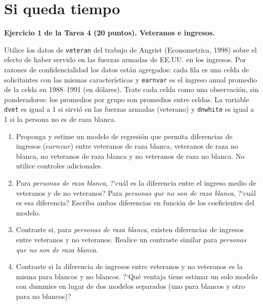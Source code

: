 \documentclass[letterpaper,11pt]{article}
\begin{document}
\vspace{1em}

\section*{Si queda tiempo}

\noindent\textbf{Ejercicio 1 de la Tarea 4 (20 puntos). Veteranos e ingresos.}

Utilice los datos de \texttt{veteran} del trabajo de Angrist (Econometrica,
1998) sobre el efecto de haber servido en las fuerzas armadas de EE.UU. en los ingresos.
Por razones de confidencialidad los datos est\'an agregados: cada fila es una celda de
solicitantes con las mismas caracter\'isticas y \texttt{earnvar} es el ingreso anual promedio
de la celda en 1988--1991 (en d\'olares). Trate cada celda como una observaci\'on, sin
ponderadores: los promedios por grupo son promedios entre celdas. La
variable \texttt{dvet} es igual a 1 si sirvi\'o en las fuerzas armadas (veterano) y
\texttt{dnwhite} es igual a 1 si la persona no es de raza blanca.
\begin{enumerate}
    \item Proponga y estime un modelo de regresi\'on que permita diferencias de
        ingresos ($earnvar$) entre veteranos de raza blanca, veteranos de raza no blanca, no
        veteranos de raza blanca y no veteranos de raza no blanca. No utilice controles
        adicionales.
    \item Para \emph{personas de raza blanca}, ?`cu\'al es la diferencia entre
        el ingreso medio de veteranos y de no veteranos? Para \emph{personas que no son de
        raza blanca}, ?`cu\'al es esa diferencia? Escriba ambas diferencias en funci\'on de
        los coeficientes del modelo.
    \item Contraste si, para \emph{personas de raza blanca}, existen diferencias
        de ingresos entre veteranos y no veteranos. Realice un contraste similar para
        \emph{personas que no son de raza blanca}.
    \item Contraste si la diferencia de ingresos entre veteranos y no veteranos
        es la misma para blancos y no blancos. ?`Qu\'e ventaja tiene estimar un solo modelo
        con dummies en lugar de dos modelos separados (uno para blancos y otro para no
        blancos)?
\end{enumerate}
\end{document}
